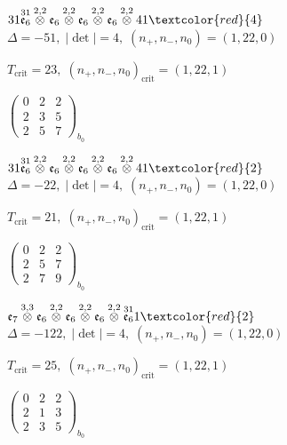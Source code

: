 \documentclass[10pt]{article}
\begin{document}
\smallskip

$31\overset{31}{\mathfrak{e}_6}\overset{2,2}{\otimes}\mathfrak{e}_6\overset{2,2}{\otimes}\mathfrak{e}_6\overset{2,2}{\otimes}\mathfrak{e}_6\overset{2,2}{\otimes}41\textcolor{red}{4}$ \quad $\Delta=-51,\; |\det|=4,\; (n_+,n_-,n_0)=(1,22,0)$

\hspace{1em}$T_{\text{crit}}=23,\; (n_+,n_-,n_0)_{\text{crit}}=(1,22,1)$

\hspace{2em}$\left(\begin{smallmatrix}0 & 2 & 2 \\ 2 & 3 & 5 \\ 2 & 5 & 7\end{smallmatrix}\right)_{\!b_0}$

$31\overset{31}{\mathfrak{e}_6}\overset{2,2}{\otimes}\mathfrak{e}_6\overset{2,2}{\otimes}\mathfrak{e}_6\overset{2,2}{\otimes}\mathfrak{e}_6\overset{2,2}{\otimes}41\textcolor{red}{2}$ \quad $\Delta=-22,\; |\det|=4,\; (n_+,n_-,n_0)=(1,22,0)$

\hspace{1em}$T_{\text{crit}}=21,\; (n_+,n_-,n_0)_{\text{crit}}=(1,22,1)$

\hspace{2em}$\left(\begin{smallmatrix}0 & 2 & 2 \\ 2 & 5 & 7 \\ 2 & 7 & 9\end{smallmatrix}\right)_{\!b_0}$

\smallskip

$\mathfrak{e}_7\overset{3,3}{\otimes}\mathfrak{e}_6\overset{2,2}{\otimes}\mathfrak{e}_6\overset{2,2}{\otimes}\mathfrak{e}_6\overset{2,2}{\otimes}\overset{31}{\mathfrak{e}_6}1\textcolor{red}{2}$ \quad $\Delta=-122,\; |\det|=4,\; (n_+,n_-,n_0)=(1,22,0)$

\hspace{1em}$T_{\text{crit}}=25,\; (n_+,n_-,n_0)_{\text{crit}}=(1,22,1)$

\hspace{2em}$\left(\begin{smallmatrix}0 & 2 & 2 \\ 2 & 1 & 3 \\ 2 & 3 & 5\end{smallmatrix}\right)_{\!b_0}$
\end{document}
